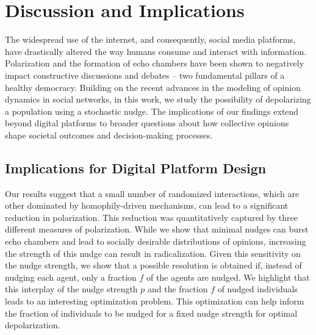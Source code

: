 \section{Discussion and Implications}
The widespread use of the internet, and consequently, social media platforms, have drastically altered the way humans consume and interact with information. Polarization and the formation of echo chambers have been shown to negatively impact constructive discussions and debates -- two fundamental pillars of a healthy democracy. Building on the recent advances in the modeling of opinion dynamics in social networks, in this work, we study the possibility of depolarizing a population using a stochastic nudge. The implications of our findings extend beyond digital platforms to broader questions about how collective opinions shape societal outcomes and decision-making processes.
\subsection{Implications for Digital Platform Design}
Our results suggest that a small number of randomized interactions, which are other dominated by homophily-driven mechanisms, can lead to a significant reduction in polarization. This reduction was quantitatively captured by three different measures of polarization. While we show that minimal nudges can burst echo chambers and lead to socially desirable distributions of opinions, increasing the strength of this nudge can result in radicalization. Given this sensitivity on the nudge strength, we show that a possible resolution is obtained if, instead of nudging each agent, only a fraction $f$ of the agents are nudged. We highlight that this interplay of the nudge strength $p$ and the fraction $f$ of nudged individuals leads to an interesting optimization problem. This optimization can help inform the fraction of individuals to be nudged for a fixed nudge strength for optimal depolarization.

